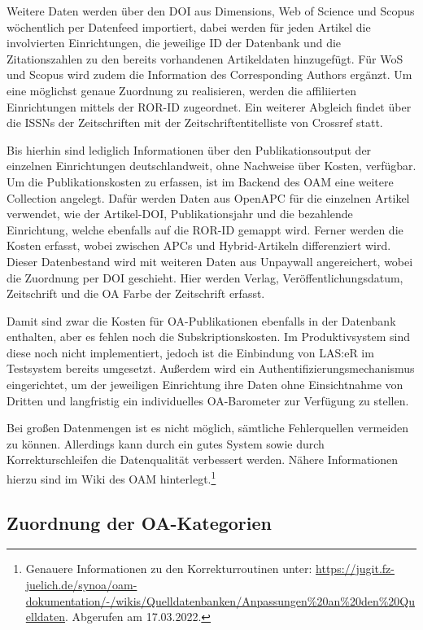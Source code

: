 \documentclass[a4paper,
fontsize=11pt,
oneside,
numbers=noperiodatend,
parskip=half-,
bibliography=totoc,
final
]{scrartcl}
\begin{document}
Weitere Daten werden über den DOI aus Dimensions, Web of Science und
Scopus wöchentlich per Datenfeed importiert, dabei werden für jeden
Artikel die involvierten Einrichtungen, die jeweilige ID der Datenbank
und die Zitationszahlen zu den bereits vorhandenen Artikeldaten
hinzugefügt. Für WoS und Scopus wird zudem die Information des
Corresponding Authors ergänzt. Um eine möglichst genaue Zuordnung zu
realisieren, werden die affiliierten Einrichtungen mittels der ROR-ID
zugeordnet. Ein weiterer Abgleich findet über die ISSNs der
Zeitschriften mit der Zeitschriftentitelliste von Crossref statt.

Bis hierhin sind lediglich Informationen über den Publikationsoutput der
einzelnen Einrichtungen deutschlandweit, ohne Nachweise über Kosten,
verfügbar. Um die Publikationskosten zu erfassen, ist im Backend des OAM
eine weitere Collection angelegt. Dafür werden Daten aus OpenAPC für die
einzelnen Artikel verwendet, wie der Artikel-DOI, Publikationsjahr und
die bezahlende Einrichtung, welche ebenfalls auf die ROR-ID gemappt
wird. Ferner werden die Kosten erfasst, wobei zwischen APCs und
Hybrid-Artikeln differenziert wird. Dieser Datenbestand wird mit
weiteren Daten aus Unpaywall angereichert, wobei die Zuordnung per DOI
geschieht. Hier werden Verlag, Veröffentlichungsdatum, Zeitschrift und
die OA Farbe der Zeitschrift erfasst.

Damit sind zwar die Kosten für OA-Publikationen ebenfalls in der
Datenbank enthalten, aber es fehlen noch die Subskriptionskosten. Im
Produktivsystem sind diese noch nicht implementiert, jedoch ist die
Einbindung von LAS:eR im Testsystem bereits umgesetzt. Außerdem wird ein
Authentifizierungsmechanismus eingerichtet, um der jeweiligen
Einrichtung ihre Daten ohne Einsichtnahme von Dritten und langfristig
ein individuelles OA-Barometer zur Verfügung zu stellen.

Bei großen Datenmengen ist es nicht möglich, sämtliche Fehlerquellen
vermeiden zu können. Allerdings kann durch ein gutes System sowie durch
Korrekturschleifen die Datenqualität verbessert werden. Nähere
Informationen hierzu sind im Wiki des OAM hinterlegt.\footnote{Genauere
  Informationen zu den Korrekturroutinen unter:
  \url{https://jugit.fz-juelich.de/synoa/oam-dokumentation/-/wikis/Quelldatenbanken/Anpassungen\%20an\%20den\%20Quelldaten}.
  Abgerufen am 17.03.2022.}

\hypertarget{zuordnung-der-oa-kategorien}{%
\subsection{Zuordnung der
OA-Kategorien}\label{zuordnung-der-oa-kategorien}}
\end{document}
